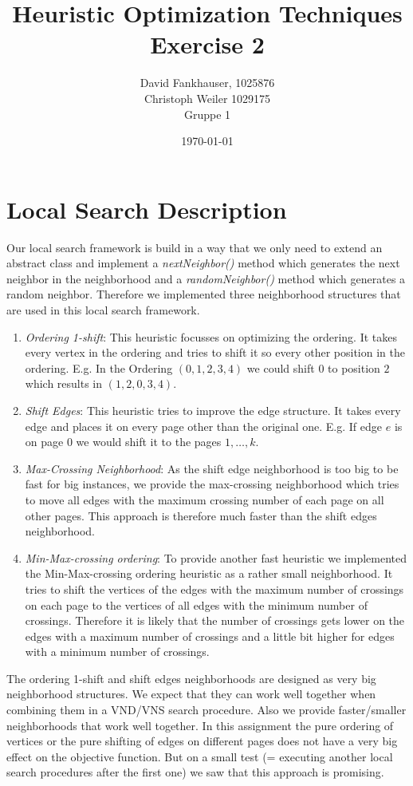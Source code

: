 \documentclass[11pt]{article}
\title{\textbf{Heuristic Optimization Techniques }\\Exercise 2}
\author{David Fankhauser, 1025876\\ Christoph Weiler 1029175\\Gruppe 1}
\date{\today}
\begin{document}
\lstset{language=C++}
\maketitle
 
\section{Local Search Description}
Our local search framework is build in a way that we only need to extend an abstract class and implement a \textit{nextNeighbor()} method which generates the next neighbor in the neighborhood and a \textit{randomNeighbor()} method which generates a random neighbor.
Therefore we implemented three neighborhood structures that are used in this local search framework.

\begin{enumerate}
	\item \textit{Ordering 1-shift}: This heuristic focusses on optimizing the ordering. It takes every vertex in the ordering and tries to shift it so every other position in the ordering.
		E.g. In the Ordering $(0, 1, 2, 3, 4)$ we could shift $0$ to position $2$ which results in $(1, 2, 0, 3, 4)$.
	\item \textit{Shift Edges}: This heuristic tries to improve the edge structure. It takes every edge and places it on every page other than the original one.
		E.g. If edge $e$ is on page $0$ we would shift it to the pages $1, \dots, k$.
	\item \textit{Max-Crossing Neighborhood}: As the shift edge neighborhood is too big to be fast for big instances, 
		we provide the max-crossing neighborhood which tries to move all edges with the maximum crossing number of each page on all other pages.
		This approach is therefore much faster than the shift edges neighborhood.
	\item \textit{Min-Max-crossing ordering}: To provide another fast heuristic we implemented the Min-Max-crossing ordering heuristic as a rather small neighborhood.
		It tries to shift the vertices of the edges with the maximum number of crossings on each page to the vertices of all edges with the minimum number of crossings.
		Therefore it is likely that the number of crossings gets lower on the edges with a maximum number of crossings and a little bit higher for edges with a minimum number of crossings.
\end{enumerate}

The ordering 1-shift and shift edges neighborhoods are designed as very big neighborhood structures.
We expect that they can work well together when combining them in a VND/VNS search procedure.
Also we provide faster/smaller neighborhoods that work well together.
In this assignment the pure ordering of vertices or the pure shifting of edges on different pages does not have a very big effect on the objective function.
But on a small test (= executing another local search procedures after the first one) we saw that this approach is promising.
\end{document}
